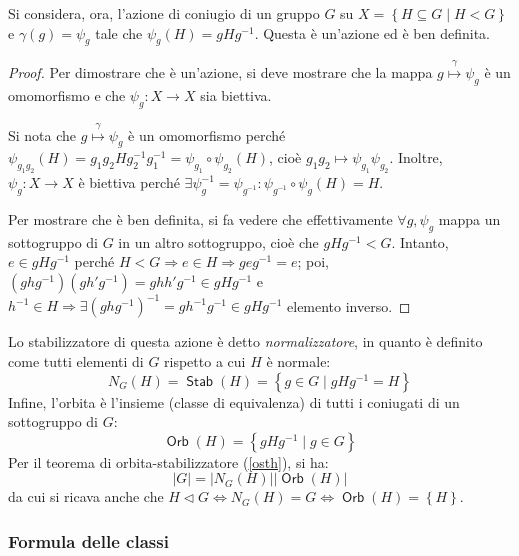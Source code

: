 \documentclass[11pt]{scrartcl}
\theoremstyle{style1}
\numberwithin{equation}{subsection}
\renewcommand{\operatorname}[1]{\mathop{\mathrm{\textsf{#1}}}}
\begin{document}
Si considera, ora, l'azione di coniugio di un gruppo $G$ su $X = \left\{ H \subseteq G  \mid H< G \right\} $ e $\gamma(g) = \psi _g$ tale che $\psi_g (H) = gH g^{-1} $. 
Questa \`e un'azione ed \`e ben definita.
\begin{proof}
	Per dimostrare che \`e un'azione, si deve mostrare che la mappa $g \stackrel{\gamma}{\mapsto} \psi _g$ \`e un omomorfismo e che $\psi _g : X \to X$ sia biettiva.

	Si nota che $g \stackrel{\gamma}{\mapsto} \psi _g$ \`e un omomorfismo perch\'e $\psi _{g_1g_2} (H) = g_1g_2Hg_2^{-1}g_1^{-1} = \psi _{g_1} \circ \psi _{g_2} (H)$, cio\`e $g_1g_2\mapsto \psi _{g_1} \psi _{g_2} $.
	Inoltre, $\psi _g:X\to X$ \`e biettiva perch\'e $\exists \psi ^{-1} _g = \psi _{g^{-1}} : \psi _{g^{-1}} \circ \psi _g (H) = H $.

	Per mostrare che \`e ben definita, si fa vedere che effettivamente $\forall g, \psi_g$ mappa un sottogruppo di $G$ in un altro sottogruppo, cio\`e che $gHg^{-1} < G$.
	Intanto, $e \in gHg^{-1} $ perch\'e $H < G \Rightarrow  e \in H \Rightarrow geg^{-1}=e$; poi, $(ghg^{-1})(gh'g^{-1}) = ghh'g^{-1} \in g H g ^{-1}$ e $h^{-1} \in H \Rightarrow \exists (ghg^{-1} )^{-1} = g h^{-1}g^{-1}\in gHg^{-1}$ elemento inverso.
\end{proof}
\noindent Lo stabilizzatore di questa azione \`e detto \textit{normalizzatore}, in quanto \`e definito come tutti elementi di $G$ rispetto a cui $H$ \`e normale: 
\begin{equation}
	N_G(H) = \operatorname{Stab} (H) = \left\{ g \in G  \mid g H g^{-1}= H \right\} 
\end{equation}
Infine, l'orbita \`e l'insieme (classe di equivalenza) di tutti i coniugati di un sottogruppo di $G$:
\begin{equation}
\operatorname{Orb} (H) = \left\{ gHg^{-1}  \mid  g \in G \right\} 
\end{equation}
Per il teorema di orbita-stabilizzatore (\ref{osth}), si ha:
\begin{equation}
	\lvert G \rvert  = \lvert N_G(H) \rvert \lvert \operatorname{Orb} (H) \rvert 
\end{equation}
da cui si ricava anche che $H \lhd G \iff N_G(H) = G \iff \operatorname{Orb} (H) = \left\{ H \right\} $.
\subsubsection{Formula delle classi}
\end{document}
